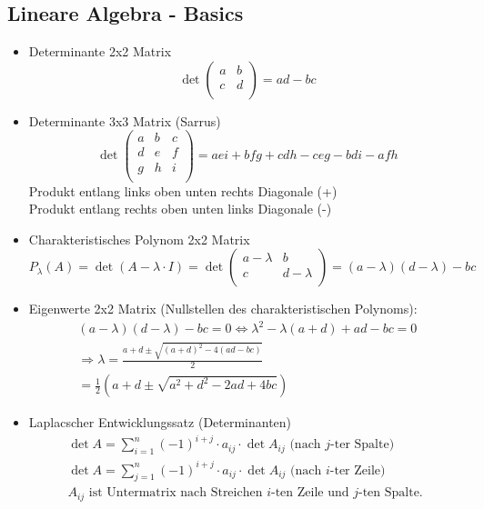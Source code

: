 \documentclass[a4paper]{article}
\begin{document}
\subsection{Lineare Algebra - Basics}
\begin{itemize}
	\item Determinante 2x2 Matrix
		\[
		\det \begin{pmatrix} 
			a & b \\
			c & d \\
		\end{pmatrix} 
		= ad - bc
		\] 
	\item Determinante 3x3 Matrix (Sarrus)
		\[
		\det \begin{pmatrix} 
			a & b & c \\
			d & e & f \\
			g & h & i \\
		\end{pmatrix} =
		aei + bfg + cdh
		- ceg - bdi - afh
		\] 
		Produkt entlang links oben unten rechts Diagonale (+) \\
		Produkt entlang rechts oben unten links Diagonale (-)
	\item Charakteristisches Polynom 2x2 Matrix
		\[
			P_\lambda (A)
			= \det (A - \lambda \cdot I) =
			\det \begin{pmatrix} 
				a - \lambda & b \\
				c & d - \lambda \\
			\end{pmatrix} =
			(a - \lambda) (d - \lambda) - bc
		\] 
	\item Eigenwerte 2x2 Matrix
		(Nullstellen des charakteristischen Polynoms):
		\begin{gather*}
			(a - \lambda) (d - \lambda) - bc = 0
			\Leftrightarrow 
			\lambda ^2 - \lambda (a + d) + ad - bc = 0 \\
			\Rightarrow
			\lambda = \frac{ a+d \pm \sqrt{(a+d) ^2 -4 (ad -bc)} }{ 2 } \\
			= \frac{ 1 }{ 2 } \left(
				a + d \pm \sqrt{
					a ^2 + d ^2 - 2 ad + 4 bc
				} 
			\right) 
		\end{gather*}
	\item Laplacscher Entwicklungssatz (Determinanten)
		\begin{gather*}
			\det A = \sum_{i=1}^{n} (-1) ^{i+j} \cdot a_{ij} \cdot \det A_{ij}
			\text{ (nach $j$-ter Spalte) }
			\\
			\det A = \sum_{j=1}^{n} (-1) ^{i+j} \cdot a_{ij} \cdot \det A_{ij}
			\text{ (nach $i$-ter Zeile) }
			\\
			A_{ij} \text{ ist Untermatrix nach Streichen $i$-ten Zeile}
			\text{ und $j$-ten Spalte. }
		\end{gather*}
\end{itemize}
\end{document}
